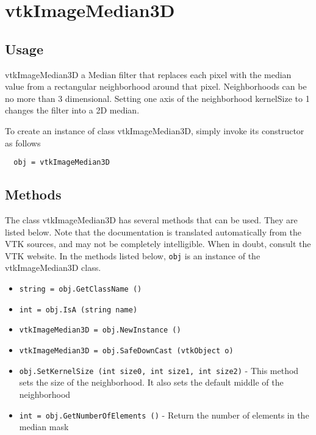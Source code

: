 \section{vtkImageMedian3D}

\subsection{Usage}

 vtkImageMedian3D a Median filter that replaces each pixel with the 
 median value from a rectangular neighborhood around that pixel.
 Neighborhoods can be no more than 3 dimensional.  Setting one
 axis of the neighborhood kernelSize to 1 changes the filter
 into a 2D median.  

To create an instance of class vtkImageMedian3D, simply
invoke its constructor as follows
\begin{verbatim}
  obj = vtkImageMedian3D
\end{verbatim}
\subsection{Methods}

The class vtkImageMedian3D has several methods that can be used.
  They are listed below.
Note that the documentation is translated automatically from the VTK sources,
and may not be completely intelligible.  When in doubt, consult the VTK website.
In the methods listed below, \verb|obj| is an instance of the vtkImageMedian3D class.
\begin{itemize}
\item  \verb|string = obj.GetClassName ()|

\item  \verb|int = obj.IsA (string name)|

\item  \verb|vtkImageMedian3D = obj.NewInstance ()|

\item  \verb|vtkImageMedian3D = obj.SafeDownCast (vtkObject o)|

\item  \verb|obj.SetKernelSize (int size0, int size1, int size2)| -  This method sets the size of the neighborhood.  It also sets the 
 default middle of the neighborhood 

\item  \verb|int = obj.GetNumberOfElements ()| -  Return the number of elements in the median mask

\end{itemize}

